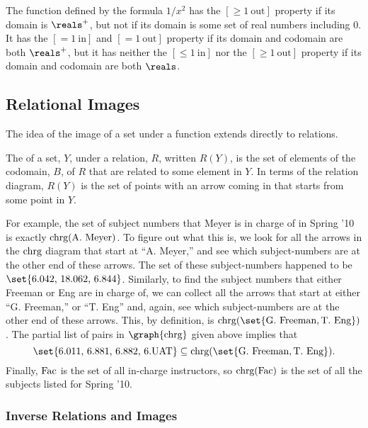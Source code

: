 \begin{example}
  The function defined by the formula $1/x^2$ has the $[\ge 1\
  \text{out}]$ property if its domain is $\reals^+$, but not if its domain
  is some set of real numbers including 0.  It has the $[=1\ \text{in}]$
  and $[=1\ \text{out}]$ property if its domain and codomain are both
  $\reals^+$, but it has neither the $[\le 1\ \text{in}]$ nor the $[\ge 1\
  \text{out}]$ property if its domain and codomain are both $\reals$.
\end{example}

\subsection{Relational Images}
The idea of the image of a set under a function extends directly to
relations.

\begin{definition}
  The  of a set, $Y$, under a relation, $R$, written $R(Y)$,
  is the set of elements of the codomain, $B$, of $R$ that are related to
  some element in $Y$.  In terms of the relation diagram, $R(Y)$ is the
  set of points with an arrow coming in that starts from some point in $Y$.
\iffalse
, namely,
\[
R(Y) \eqdef \set{b \in B \suchthat yRb \text{ for some } y \in Y}.
\]\fi
\end{definition}

For example, the set of subject numbers that Meyer is in charge of in Spring
'10 is exactly $\text{chrg}(\text{A. Meyer})$.  To figure out what this
is, we look for all the arrows in the $\text{chrg}$ diagram that start at
``A. Meyer,'' and see which subject-numbers are at the other end of
these arrows.  The set of these subject-numbers happened to be
$\set{\text{6.042, 18.062, 6.844}}$.  Similarly, to find the subject
numbers that either Freeman or Eng are in charge of, we can collect
all the arrows that start at either ``G. Freeman,'' or ``T. Eng'' and,
again, see which subject-numbers are at the other end of these arrows.
This, by definition, is $\inchrg(\set{\text{G. Freeman},
  \text{T. Eng}})$.  The partial list of pairs in $\graph{\inchrg}$
given above implies that
\[
\set{\text{6.011, 6.881, 6.882, 6.UAT}} \subseteq
\inchrg(\set{\text{G. Freeman}, \text{T. Eng}}).
\]
Finally, $\text{Fac}$ is the set of all in-charge instructors, so
$\text{chrg}(\text{Fac})$ is the set of all the subjects listed for Spring '10.

\subsubsection{Inverse Relations and Images}

